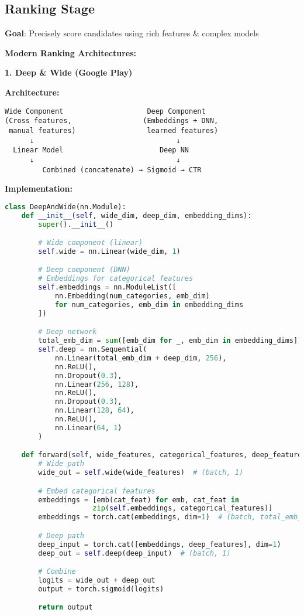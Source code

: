 \documentclass[10pt]{article}
\begin{document}
\subsection{Ranking Stage}

\textbf{Goal}: Precisely score candidates using rich features \& complex models

\textbf{Modern Ranking Architectures:}

\textbf{1. Deep \& Wide (Google Play)}

\textbf{Architecture:}
\begin{verbatim}
Wide Component                    Deep Component
(Cross features,                 (Embeddings + DNN,
 manual features)                 learned features)
      ↓                                  ↓
  Linear Model                       Deep NN
      ↓                                  ↓
         Combined (concatenate) → Sigmoid → CTR
\end{verbatim}

\textbf{Implementation:}
\begin{lstlisting}[language=Python]
class DeepAndWide(nn.Module):
    def __init__(self, wide_dim, deep_dim, embedding_dims):
        super().__init__()

        # Wide component (linear)
        self.wide = nn.Linear(wide_dim, 1)

        # Deep component (DNN)
        # Embeddings for categorical features
        self.embeddings = nn.ModuleList([
            nn.Embedding(num_categories, emb_dim)
            for num_categories, emb_dim in embedding_dims
        ])

        # Deep network
        total_emb_dim = sum([emb_dim for _, emb_dim in embedding_dims])
        self.deep = nn.Sequential(
            nn.Linear(total_emb_dim + deep_dim, 256),
            nn.ReLU(),
            nn.Dropout(0.3),
            nn.Linear(256, 128),
            nn.ReLU(),
            nn.Dropout(0.3),
            nn.Linear(128, 64),
            nn.ReLU(),
            nn.Linear(64, 1)
        )

    def forward(self, wide_features, categorical_features, deep_features):
        # Wide path
        wide_out = self.wide(wide_features)  # (batch, 1)

        # Embed categorical features
        embeddings = [emb(cat_feat) for emb, cat_feat in
                     zip(self.embeddings, categorical_features)]
        embeddings = torch.cat(embeddings, dim=1)  # (batch, total_emb_dim)

        # Deep path
        deep_input = torch.cat([embeddings, deep_features], dim=1)
        deep_out = self.deep(deep_input)  # (batch, 1)

        # Combine
        logits = wide_out + deep_out
        output = torch.sigmoid(logits)

        return output
\end{lstlisting}
\end{document}
